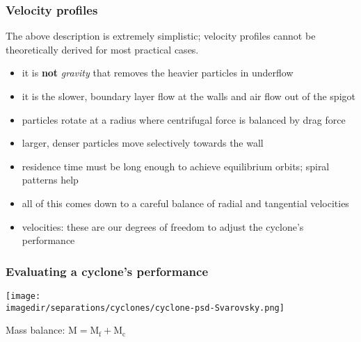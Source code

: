 \begin{frame}\frametitle{Velocity profiles}
	\begin{exampleblock}{}
		The above description is extremely simplistic; velocity profiles cannot be theoretically derived for most practical cases.
	\end{exampleblock}
	
	\begin{itemize}
		\item	it is \textbf{not} \emph{gravity} that removes the heavier particles in underflow
		\item	it is the slower, boundary layer flow at the walls and air flow out of the spigot
		\item	particles rotate at a radius where centrifugal force is balanced by drag force
		\item	larger, denser particles move selectively towards the wall
		\item	residence time must be long enough to achieve equilibrium orbits; spiral patterns help
		\item	all of this comes down to a careful balance of radial and tangential velocities
		\item	velocities: these are our degrees of freedom to adjust the cyclone's performance
	\end{itemize}	
\end{frame}

\begin{frame}\frametitle{Evaluating a cyclone's performance}
	\begin{center}
		\texttt{[image: \\imagedir/separations/cyclones/cyclone-psd-Svarovsky.png]}
	\end{center}
	
	\vspace{-48pt}
	Mass balance: $\text{M} = \text{M}_\text{f} + \text{M}_\text{c}$	
	\vfill
\end{frame}

